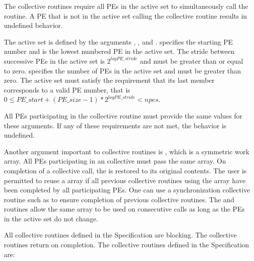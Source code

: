 \begin{DeprecateBlock}
The  collective routines require all \acp{PE}
in the active set to simultaneously call the
routine.  A \ac{PE} that is not in the active set calling the collective
routine results in undefined behavior.  

The active set is defined by the arguments , ,
and .   specifies the starting \ac{PE} number and
is the lowest numbered \ac{PE} in the active set.  The stride between successive
\acp{PE} in the active set is $2^{logPE\_stride}$ and  must
be greater than or equal to zero.   specifies the number of
\acp{PE} in the active set and must be greater than zero.  The active set must
satisfy the requirement that its last member corresponds to a valid \ac{PE}
number, that is
$0 \le PE\_start + (PE\_size - 1) * 2^{logPE\_stride} < npes$.

All \acp{PE} participating in the  collective routine must provide the same
values for these arguments.  If any of these requirements are not met, the
behavior is undefined.

Another argument important to  collective routines is , which is a
symmetric work array.  All \acp{PE} participating in an  collective must pass the
same  array.  On completion of  a collective call, the  is
restored to its original contents.  The user is permitted to reuse a 
array if all previous collective routines using the  array have been
completed by all participating \acp{PE}. One can use a synchronization
collective routine such as  to ensure completion of previous  collective
routines. The  and  routines allow the same
 array to be used on consecutive calls as long as the \acp{PE}
in the active set do not change.

All collective routines defined in the Specification are blocking.  The
collective routines return on completion.  The  collective
routines defined in the \openshmem Specification are:


\end{DeprecateBlock}
